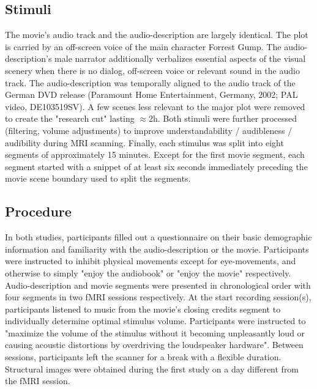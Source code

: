 \documentclass[english]{article}
\begin{document}

\subsection{Stimuli}
The movie's audio track and the audio-description are largely identical. The plot is carried by an off-screen voice of the main character Forrest Gump. The audio-description's male narrator additionally verbalizes essential aspects of the visual scenery when there is no dialog, off-screen voice or relevant sound in the audio track.
The audio-description was temporally aligned to the audio track of the German DVD release (Paramount Home Entertainment, Germany, 2002; PAL video, DE103519SV). A few scenes less relevant to the major plot were removed to create the "research cut" lasting $\approx$2h. Both stimuli were further processed (filtering, volume adjustments) to improve understandability / audibleness / audibility during MRI scanning. Finally, each stimulus was split into eight segments of approximately 15 minutes. Except for the first movie segment, each segment started with a snippet of at least six seconds immediately preceding the movie scene boundary used to split the segments. 

\subsection{Procedure}
In both studies, participants filled out a questionnaire on their basic demographic information and familiarity with the audio-description or the movie. Participants were instructed to inhibit physical movements except for eye-movements, and otherwise to simply "enjoy the audiobook" or "enjoy the movie" respectively.
Audio-description and movie segments were presented in chronological order with four segments in two fMRI sessions respectively.  At the start recording session(s), participants listened to music from the movie’s closing credits segment to individually determine optimal stimulus volume. Participants were instructed to "maximize the volume of the stimulus without it becoming unpleasantly loud or causing acoustic distortions by overdriving the loudspeaker hardware". %
Between sessions, participants left the scanner for a break with a flexible duration. Structural images were obtained during the first study on a day different from the fMRI session.
\end{document}
